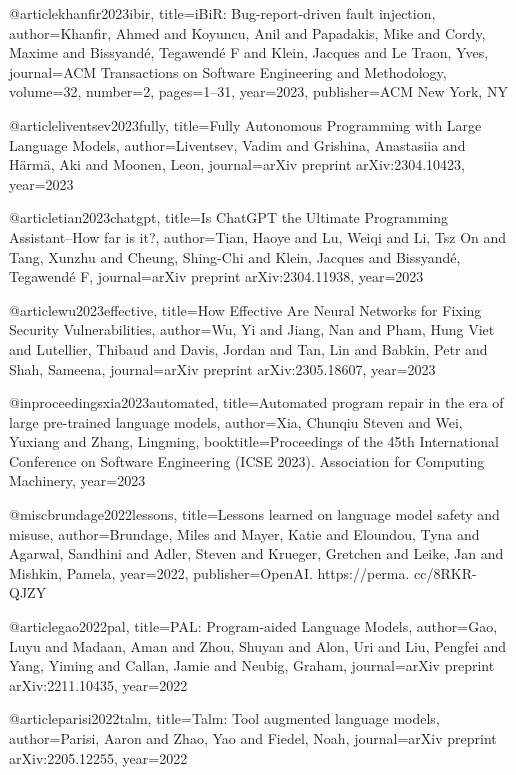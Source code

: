 @article{khanfir2023ibir,
  title={iBiR: Bug-report-driven fault injection},
  author={Khanfir, Ahmed and Koyuncu, Anil and Papadakis, Mike and Cordy, Maxime and Bissyand{\'e}, Tegawend{\'e} F and Klein, Jacques and Le Traon, Yves},
  journal={ACM Transactions on Software Engineering and Methodology},
  volume={32},
  number={2},
  pages={1--31},
  year={2023},
  publisher={ACM New York, NY}
}

@article{liventsev2023fully,
  title={Fully Autonomous Programming with Large Language Models},
  author={Liventsev, Vadim and Grishina, Anastasiia and H{\"a}rm{\"a}, Aki and Moonen, Leon},
  journal={arXiv preprint arXiv:2304.10423},
  year={2023}
}

@article{tian2023chatgpt,
  title={Is ChatGPT the Ultimate Programming Assistant--How far is it?},
  author={Tian, Haoye and Lu, Weiqi and Li, Tsz On and Tang, Xunzhu and Cheung, Shing-Chi and Klein, Jacques and Bissyand{\'e}, Tegawend{\'e} F},
  journal={arXiv preprint arXiv:2304.11938},
  year={2023}
}

@article{wu2023effective,
  title={How Effective Are Neural Networks for Fixing Security Vulnerabilities},
  author={Wu, Yi and Jiang, Nan and Pham, Hung Viet and Lutellier, Thibaud and Davis, Jordan and Tan, Lin and Babkin, Petr and Shah, Sameena},
  journal={arXiv preprint arXiv:2305.18607},
  year={2023}
}

@inproceedings{xia2023automated,
  title={Automated program repair in the era of large pre-trained language models},
  author={Xia, Chunqiu Steven and Wei, Yuxiang and Zhang, Lingming},
  booktitle={Proceedings of the 45th International Conference on Software Engineering (ICSE 2023). Association for Computing Machinery},
  year={2023}
}




@misc{brundage2022lessons,
  title={Lessons learned on language model safety and misuse},
  author={Brundage, Miles and Mayer, Katie and Eloundou, Tyna and Agarwal, Sandhini and Adler, Steven and Krueger, Gretchen and Leike, Jan and Mishkin, Pamela},
  year={2022},
  publisher={OpenAI. https://perma. cc/8RKR-QJZY}
}

@article{gao2022pal,
  title={PAL: Program-aided Language Models},
  author={Gao, Luyu and Madaan, Aman and Zhou, Shuyan and Alon, Uri and Liu, Pengfei and Yang, Yiming and Callan, Jamie and Neubig, Graham},
  journal={arXiv preprint arXiv:2211.10435},
  year={2022}
}

@article{parisi2022talm,
  title={Talm: Tool augmented language models},
  author={Parisi, Aaron and Zhao, Yao and Fiedel, Noah},
  journal={arXiv preprint arXiv:2205.12255},
  year={2022}
}

